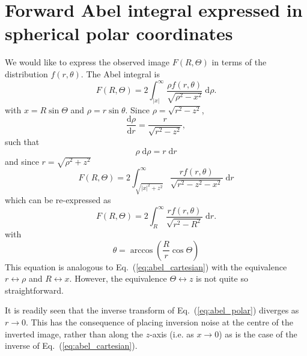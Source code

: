 \documentclass{article}
\renewcommand{\eqref}[1]{Eq.~(\ref{#1})}
\newcommand{\dee}{\ensuremath{\mathrm{d}}}
\begin{document}
\section{Forward Abel integral expressed in spherical polar coordinates} 
We would like to express the observed image $F(R, \Theta)$ in terms of the
distribution $f(r, \theta)$. The Abel integral is
\begin{equation}
  F(R, \Theta)=2\int_{|x|}^\infty
  \frac{\rho f(r, \theta)}{\sqrt{\rho^2-x^2}}\;\dee \rho.
\end{equation}
with $x=R\sin\Theta$ and $\rho=r\sin\theta$. Since $\rho=\sqrt{r^2-z^2}$,
\begin{equation}
  \frac{\dee \rho}{\dee r}=
  \frac{r}{\sqrt{r^2-z^2}},
\end{equation}
such that
\begin{equation}
  \rho\;\dee \rho=r\;\dee r
\end{equation}
and since $r=\sqrt{\rho^2+z^2}$
\begin{equation}
  F(R, \Theta)=
  2\int_{\sqrt{|x|^2+z^2}}^\infty
  \frac{rf(r, \theta)}{\sqrt{r^2-z^2-x^2}}\;\dee r
\end{equation}
which can be re-expressed as
\begin{equation}
  \label{eq:abel_polar}
  F(R, \Theta)=
  2\int_{R}^\infty
  \frac{rf(r, \theta)}{\sqrt{r^2-R^2}}\;\dee r.
\end{equation}
with 
\begin{equation}
  \theta=\arccos\left(
    \frac{R}{r}\cos\Theta
  \right)
\end{equation}
This equation is analogous to \eqref{eq:abel_cartesian} with the equivalence
$r\leftrightarrow\rho$ and $R\leftrightarrow x$. However, the equivalence
$\Theta\leftrightarrow z$ is not quite so straightforward.

It is readily seen that the inverse transform of \eqref{eq:abel_polar}
diverges as $r\rightarrow0$. This has the consequence of placing inversion
noise at the centre of the inverted image, rather than along the $z$-axis
(i.e. as $x\rightarrow0$) as is the case of the inverse of
\eqref{eq:abel_cartesian}.
\end{document}
